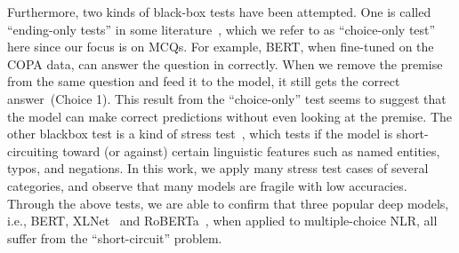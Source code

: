 Furthermore, two kinds of black-box tests have been attempted.
One is called ``ending-only tests'' in some literature~\cite{endingonly1,endingonly2}, 
which we refer to as ``choice-only test'' here since 
our focus is on MCQs.
For example, BERT, when fine-tuned on the COPA data, can answer
the question in  correctly. When we remove the premise from 
the same question and feed it to the model, it still
gets the correct answer~(Choice 1). This result from the ``choice-only'' 
test seems to suggest that the model can make correct predictions
without even looking at the premise. 
The other blackbox test is a kind of stress test~\cite{checklist2020acl}, 
which tests if the model is short-circuiting toward (or against) certain linguistic features
such as named entities, typos, and negations.
In this work, we apply many stress test cases of several categories, 
and observe that many models are fragile with low accuracies.
Through the above tests, we are able to confirm that three popular 
deep models, i.e., BERT, XLNet~\cite{xlnet2019nips} and 
RoBERTa~\cite{roberta2019}, when applied to multiple-choice NLR, 
all suffer from the ``short-circuit'' problem.


%

